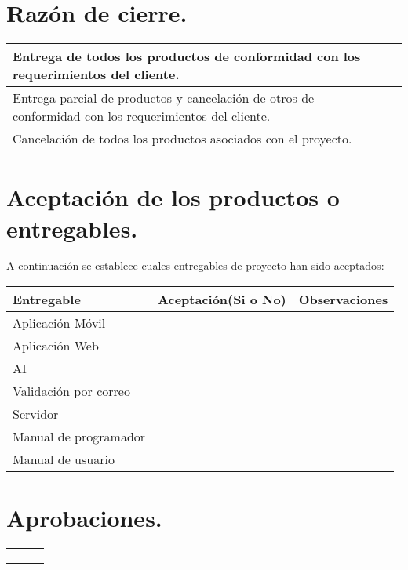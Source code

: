 \section{Razón de cierre.}
\begin{center}
    \begin{tabular}{|p{10cm}|p{3cm}|}
        \hline
        Entrega  de todos los productos  de conformidad  con los requerimientos  del cliente. & \\
        \hline
        Entrega  parcial de productos  y  cancelación  de otros de conformidad  con los requerimientos  del cliente. & \\
        \hline
        Cancelación de todos los productos asociados con el proyecto. & \\
        \hline
    \end{tabular}
\end{center}

\section{Aceptación de los productos o entregables.}
\begin{center}
    A continuación  se establece cuales  entregables  de proyecto  han  sido aceptados:
    \begin{tabular}{|p{4cm}|p{3cm}|p{6cm}|}
        \hline
        \rowcolor{lightgray} \textbf{Entregable} & \textbf{Aceptación(Si o No)} & \textbf{Observaciones} \\
        \hline
        Aplicación Móvil & & \\
        \hline
        Aplicación Web & & \\
        \hline
        AI & & \\
        \hline
        Validación por correo& & \\
        \hline
        Servidor & & \\
        \hline
        Manual de programador & & \\
        \hline
        Manual de usuario & & \\
        \hline
    \end{tabular}
\end{center}

\section{Aprobaciones.}
\begin{center}
    \begin{tabular}{|p{4cm}|p{3cm}|p{6cm}|}
        \hline
        & & \\
        \hline
        & & \\
        \hline
        & & \\
        \hline
        & & \\
        \hline
    \end{tabular}
\end{center}